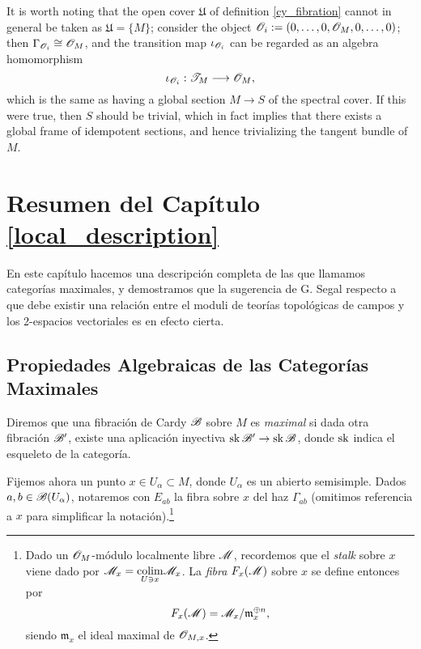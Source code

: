 It is worth noting that the open cover $\mathfrak{U}$ of definition \ref{cy_fibration} cannot in general be taken as $\mathfrak{U}=\{M\}$; consider the object $\mathscr{O}_i:=(0,\dots ,0,\mathscr{O}_M,0,\dots ,0)$; then $\Gamma_{\mathscr{O}_i}\cong \mathscr{O}_M$, and the transition map $\iota_{\mathscr{O}_i}$ can be regarded as an algebra homomorphism
$$\iota_{\mathscr{O}_i}:\mathscr{T}_M\longrightarrow \mathscr{O}_M,$$
which is the same as having a global section $M\to S$ of the spectral cover. If this were true, then $S$ should be trivial, which in fact implies that there exists a global frame of idempotent sections, and hence trivializing the tangent bundle of $M$.



\clearpage

{\small
\section{Resumen del Cap\'itulo \ref{local_description}}

En este cap\'itulo hacemos una descripci\'on completa de las que llamamos categor\'ias maximales, y demostramos que la sugerencia de G. Segal respecto a que debe existir una relaci\'on entre el moduli de teor\'ias topol\'ogicas de campos y los 2-espacios vectoriales es en efecto cierta.


\subsection{Propiedades Algebraicas de las Categor\'ias Maximales}

Diremos que una fibraci\'on de Cardy $\mathscr{B}$ sobre $M$ es \emph{maximal} si dada otra fibraci\'on $\mathscr{B}'$, existe una aplicaci\'on inyectiva $\operatorname{sk}\mathscr{B}'\to \operatorname{sk}\mathscr{B}$, donde $\operatorname{sk}$ indica el esqueleto de la categor\'ia.

Fijemos ahora un punto $x\in U_\alpha \subset M$, donde $U_\alpha$ es un abierto semisimple. Dados $a,b\in \mathscr{B}(U_\alpha )$, notaremos con $E_{ab}$ la fibra sobre $x$ del haz $\Gamma_{ab}$ (omitimos referencia a $x$ para simplificar la notaci\'on).\footnote{Dado un $\mathscr{O}_M$-m\'odulo localmente libre $\mathscr{M}$, recordemos que el \emph{stalk} sobre $x$ viene dado por $\mathscr{M}_x=\underset{U\ni x}{\operatorname{colim}}\mathscr{M}_x$. La \emph{fibra} $F_x(\mathscr{M})$ sobre $x$ se define entonces por
$$F_x(\mathscr{M})=\mathscr{M}_x/\mathfrak{m}_x^{\oplus n},$$
siendo $\mathfrak{m}_x$ el ideal maximal de $\mathscr{O}_{M,x}$.}

}
